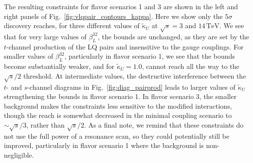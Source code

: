\documentclass[a4paper,11pt]{article}
\begin{document}
The resulting constraints for flavor scenarios 1 and 3 are shown in the left and right panels of Fig.~\ref{fig:vlqpair_contours_kappa}.
Here we show only the $5\sigma$ discovery reaches, for three different values of $\tilde{\kappa}_U$ at $\sqrt{s} = 3$ and $14\,\textrm{TeV}$.
We see that for very large values of $\beta_L^{32}$, the bounds are unchanged, as they are set by the $t$-channel production of the LQ pairs and insensitive to the gauge couplings. For smaller values of $\beta_L^{32}$, particularly in flavor scenario 1, we see that the bounds become substantially weaker, and for $\tilde{\kappa}_U = 1.0$, cannot reach all the way to the $\sqrt{s}/2$ threshold. At intermediate values, the destructive interference between the $t$- and $s$-channel diagrams in Fig.~\ref{fig:diag_pairprod} leads to larger values of $\tilde{\kappa}_U$ strengthening the bounds in flavor scenario 1. 
In flavor scenario 3, the smaller background makes the constraints less sensitive to the modified interactions, though the reach is somewhat decreased in the minimal coupling scenario to $\sim \sqrt{s}/3$, rather than $\sqrt{s}/2$. As a final note, we remind that these constraints do not use the full power of a resonance scan, so they could potentially still be improved, particularly in flavor scenario 1 where the background is non-negligible.





\end{document}

